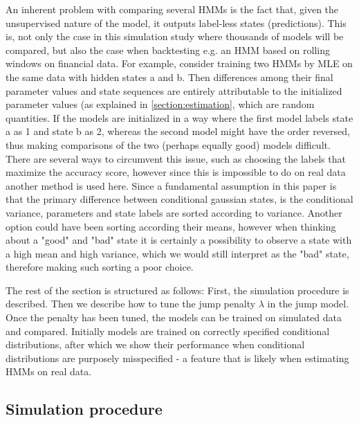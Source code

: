 An inherent problem with comparing several HMMs is the fact that, given the unsupervised nature of the model, it outputs label-less states (predictions). This is, not only the case in this simulation study where thousands of models will be compared, but also the case when backtesting e.g. an HMM based on rolling windows on financial data. For example, consider training two HMMs by MLE on the same data with hidden states a and b. Then differences among their final parameter values and state sequences are entirely attributable to the initialized parameter values (as explained in \cref{section:estimation}, which are random quantities. If the models are initialized in a way where the first model labels state a as 1 and state b as 2, whereas the second model might have the order reversed, thus making comparisons of the two (perhaps equally good) models difficult. There are several ways to circumvent this issue, such as choosing the labels that maximize the accuracy score, however since this is impossible to do on real data another method is used here. Since a fundamental assumption in this paper is that the primary difference between conditional gaussian states, is the conditional variance, parameters and state labels are sorted according to variance. Another option could have been sorting according their means, however when thinking about a "good" and "bad" state it is certainly a possibility to observe a state with a high mean and high variance, which we would still interpret as the "bad" state, therefore making such sorting a poor choice.

The rest of the section is structured as follows: First, the simulation procedure is described. Then we describe how to tune the jump penalty $\lambda$ in the jump model. Once the penalty has been tuned, the models can be trained on simulated data and compared. Initially models are trained on correctly specified conditional distributions, after which we show their performance when conditional distributions are purposely misspecified - a feature that is likely when estimating HMMs on real data.

\subsection{Simulation procedure}

